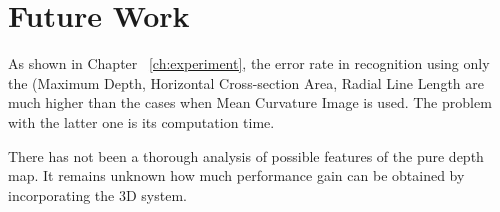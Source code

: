 \section{Future Work}

As shown in Chapter ~\ref{ch:experiment}, the error rate in recognition using only the (Maximum Depth, Horizontal Cross-section Area, Radial Line Length are much higher than the cases when Mean Curvature Image is used. The problem with the latter one is its computation time.

There has not been a thorough analysis of possible features of the pure depth map. It remains unknown how much performance gain can be obtained by incorporating the 3D system.
